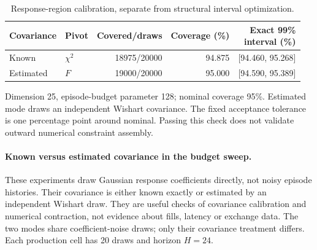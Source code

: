 \begin{table}[htbp]\centering\small
\caption{Response-region calibration, separate from structural interval optimization.}
\label{tab:response_pivot_calibration}
\begin{tabular*}{\textwidth}{@{\extracolsep{\fill}}llrrr@{}}
\toprule
Covariance & Pivot & Covered/draws & Coverage (\%) & \shortstack{Exact 99\%\\interval (\%)} \\
\midrule
Known & $\chi^2$ & 18975/20000 & 94.875 & [94.460, 95.268] \\
Estimated & $F$ & 19000/20000 & 95.000 & [94.590, 95.389] \\
\bottomrule\end{tabular*}
\par\smallskip\begin{minipage}{\textwidth}\footnotesize Dimension 25, episode-budget parameter 128; nominal coverage 95\%. Estimated mode draws an independent Wishart covariance. The fixed acceptance tolerance is one percentage point around nominal. Passing this check does not validate outward numerical constraint assembly.\end{minipage}
\end{table}

\paragraph{Known versus estimated covariance in the budget sweep.}
These experiments draw Gaussian response coefficients directly, not noisy
episode histories. Their covariance is either known exactly or estimated by
an independent Wishart draw. They are useful checks of covariance calibration
and numerical contraction, not evidence about fills, latency or exchange data.
The two modes share coefficient-noise draws; only their covariance treatment
differs. Each production cell has 20 draws and horizon $H=24$.

